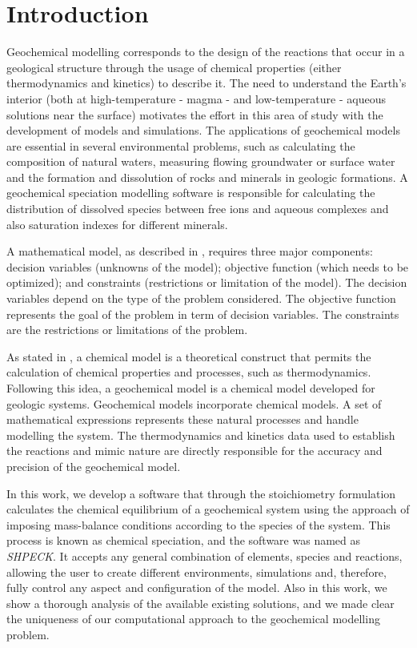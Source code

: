 \chapter{Introduction} 
\label{chapter:intro}


Geochemical modelling corresponds to the design of the reactions that occur in a geological structure through the usage of chemical properties (either thermodynamics and kinetics) to describe it. The need to understand the Earth's interior (both at high-temperature - magma - and low-temperature - aqueous solutions near the surface) motivates the effort in this area of study with the development of models and simulations. The applications of geochemical models are essential in several environmental problems, such as calculating the composition of natural waters, measuring flowing groundwater or surface water and the formation and dissolution of rocks and minerals in geologic formations. A geochemical speciation modelling software is responsible for calculating the distribution of dissolved species between free ions and aqueous complexes and also saturation indexes for different minerals. 


A mathematical model, as described in \cite{Sarker:08}, requires three major components: decision variables (unknowns of the model); objective function (which needs to be optimized); and constraints (restrictions or limitation of the model). The decision variables depend on the type of the problem considered.  The objective function represents the goal of the problem in term of decision variables. The constraints are the restrictions or limitations of the problem.

As stated in \cite{Drever:05}, a chemical model is a theoretical construct that permits the calculation of chemical properties and processes, such as thermodynamics. Following this idea, a geochemical model is a chemical model developed for geologic systems. Geochemical models incorporate chemical models. A set of mathematical expressions represents these natural processes and handle modelling the system. The thermodynamics and kinetics data used to establish the reactions and mimic nature are directly responsible for the accuracy and precision of the geochemical model.



In this work, we develop a software that through the stoichiometry formulation calculates the chemical equilibrium of a geochemical system using the approach of imposing mass-balance conditions according to the species of the system. This process is known as chemical speciation, and the software was named as \emph{SHPECK}. It accepts any general combination of elements, species and reactions, allowing the user to create different environments, simulations and, therefore, fully control any aspect and configuration of the model. Also in this work, we show a thorough analysis of the available existing solutions, and we made clear the uniqueness of our computational approach to the geochemical modelling problem. 

